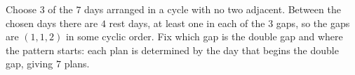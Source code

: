 Choose $3$ of the $7$ days arranged in a cycle with no two adjacent. Between the chosen days there are $4$ rest days, at least one in each of the $3$ gaps, so the gaps are $(1,1,2)$ in some cyclic order. Fix which gap is the double gap and where the pattern starts: each plan is determined by the day that begins the double gap, giving $\boxed{7}$ plans.
